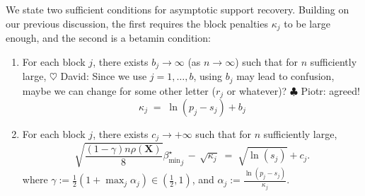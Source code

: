 \documentclass[aos]{imsart}
\theoremstyle{plain}
\newcommand{\david}[1]{{\small{\color{blue} \sf $\heartsuit$ David: #1}}}
\newcommand{\piotr}[1]{{\small{\color{red} \sf $\clubsuit$ Piotr: #1}}}
\newcommand{\bs}{\boldsymbol}
\begin{document}
We state two sufficient conditions for asymptotic support recovery. %
Building on our previous discussion, the first requires the block penalties $\kappa_j$ to be large enough,  
and the second is a betamin condition: 
\begin{enumerate}[start=6,label={(A\arabic*)}]
    \item For each block $j$, there exists $b_{j}\to \infty$ (as $n\to \infty$) such that for $n$ sufficiently large, %
    \david{Since we use $j=1,\ldots,b$, using $b_j$ may lead to confusion, maybe we can change for some other letter ($r_j$ or whatever)?}\piotr{agreed!}
\begin{equation}\label{cond:suffIreg}
    \kappa_j \;=\;\ln(p_j-s_j) + b_{j}
\end{equation}\item For each block $j$, there exists $c_{j}\to +\infty$ such that for $n$ sufficiently large, %
    \begin{equation}\label{cond:suffIIreg}
        \sqrt{\frac{(1-\gamma) n\rho(\bs X)}{8}}{{\beta_{\min}^{\star}}_j} \,- \,\sqrt{\kappa_j} \;=\; \sqrt{\ln(s_j)} + c_{j} .
    \end{equation}
where $\gamma:=\frac12(1+\max_j \alpha_j)\in (\tfrac12,1)$, and
$\alpha_j:=\frac{\ln(p_j-s_j)}{\kappa_j}$.
\end{enumerate}
\end{document}
